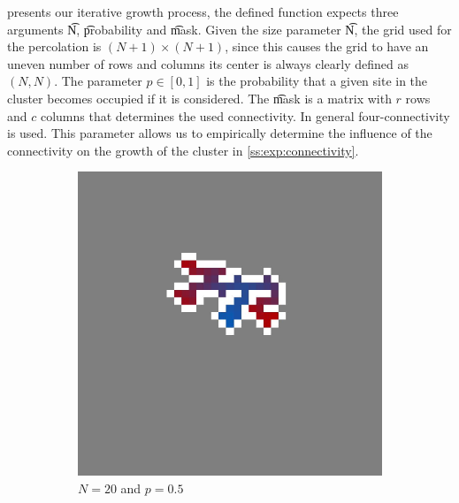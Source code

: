 presents our iterative growth process, the defined function expects three arguments \t{N}, \t{probability} and \t{mask}. Given the size parameter \t{N}, the grid used for the percolation is $(N + 1) \times (N + 1)$, since this causes the grid to have an uneven number of rows and columns its center is always clearly defined as $(N, N)$. The parameter $p \in [0, 1]$ is the probability that a given site in the cluster becomes occupied if it is considered. The \t{mask} is a matrix with $r$ rows and $c$ columns that determines the used connectivity. In general four-connectivity is used. This parameter allows us to empirically determine the influence of the connectivity on the growth of the cluster in \cref{ss:exp:connectivity}.

\begin{figure}
	\centering
	\begin{subfigure}{\columnwidth}
		\centering
		\includegraphics[width=\textwidth]{./img/fancy_cluster_N20_p5}
		\caption{$N = 20$ and $p = 0.5$}
		\label{fig:method:fin_inf:finite}
	\end{subfigure}
	\begin{subfigure}{\columnwidth}
		\centering

\end{subfigure}
\end{figure}
